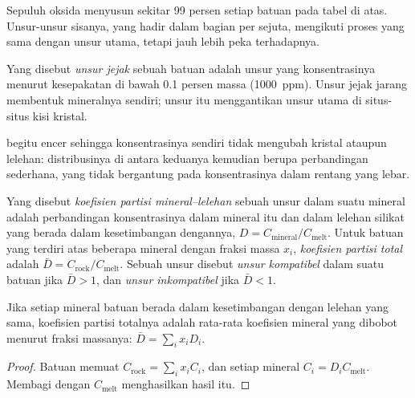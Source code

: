 Sepuluh oksida menyusun sekitar 99 persen setiap batuan pada tabel di atas. Unsur-unsur sisanya,
yang hadir dalam bagian per sejuta, mengikuti proses yang sama dengan unsur utama, tetapi
jauh lebih peka terhadapnya.

\begin{definition}\label{def:b2:elements-in-the-earth:trace}
Yang disebut \emph{unsur jejak} sebuah batuan adalah unsur yang
konsentrasinya menurut kesepakatan di bawah 0.1 persen massa (\qty{1000}{ppm}).
Unsur jejak jarang membentuk mineralnya sendiri; unsur itu menggantikan unsur
utama di situs-situs kisi kristal.
\end{definition}

 begitu encer sehingga konsentrasinya sendiri tidak mengubah
kristal ataupun lelehan: distribusinya di antara keduanya kemudian berupa perbandingan sederhana,
yang tidak bergantung pada konsentrasinya dalam rentang yang lebar.

\begin{definition}\label{def:b2:elements-in-the-earth:partition}
Yang disebut \emph{koefisien partisi mineral--lelehan}
sebuah unsur dalam suatu mineral adalah perbandingan konsentrasinya dalam
mineral itu dan dalam lelehan silikat yang berada dalam kesetimbangan dengannya,
$D = C_{\mathrm{mineral}}/C_{\mathrm{melt}}$. Untuk batuan yang terdiri atas beberapa mineral dengan
fraksi massa $x_i$, \emph{koefisien partisi total} adalah
$\bar D = C_{\mathrm{rock}}/C_{\mathrm{melt}}$. Sebuah unsur disebut
\emph{unsur kompatibel} dalam suatu batuan jika $\bar D > 1$,
dan \emph{unsur inkompatibel} jika $\bar D < 1$.
\end{definition}

\begin{proposition}
\label{prop:b2:elements-in-the-earth:bulk-d}
Jika setiap mineral batuan berada dalam kesetimbangan dengan lelehan yang sama, koefisien
partisi totalnya adalah rata-rata koefisien mineral yang dibobot menurut
fraksi massanya: $\bar D = \sum_i x_i D_i$.
\end{proposition}

\begin{proof}
Batuan memuat $C_{\mathrm{rock}} = \sum_i x_i C_i$, dan setiap mineral
$C_i = D_i C_{\mathrm{melt}}$. Membagi dengan $C_{\mathrm{melt}}$ menghasilkan hasil itu.
\end{proof}

